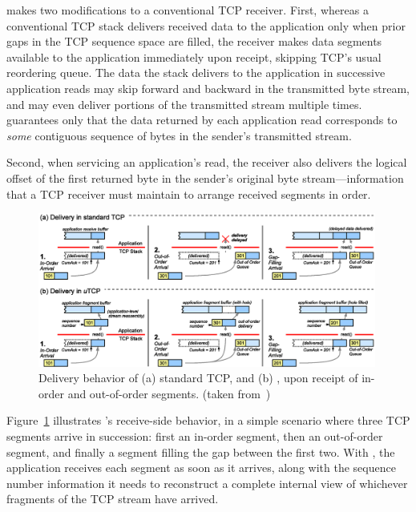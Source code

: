 \utcp makes two modifications to a conventional TCP receiver.
First, whereas a conventional TCP stack
delivers received data to the application
only when prior gaps in the TCP sequence space are filled,
the \utcp receiver
makes data segments available to the application immediately upon receipt,
skipping TCP's usual reordering queue.
The data the \utcp stack delivers to the application
in successive application reads
may skip forward and backward in the transmitted byte stream,
and \utcp may even deliver portions
of the transmitted stream multiple times.
\utcp guarantees only that the data returned by each application read
corresponds to {\em some} contiguous sequence of bytes
in the sender's transmitted stream.

Second,
when servicing an application's read,
the \utcp receiver also delivers the logical offset
of the first returned byte
in the sender's original byte stream---information 
that a TCP receiver must maintain to arrange received segments in order.

\begin{figure}[htb]
\centering
\includegraphics[width=0.99\textwidth]{figures/utcpdelivery.eps}
\caption{
Delivery behavior of (a) standard TCP, and (b) \utcp,
upon receipt of in-order and out-of-order segments.
(taken from~\cite{nowlan12fitting})}
\label{f:utcpdelivery}
\end{figure}

Figure~\ref{f:utcpdelivery} illustrates \utcp's receive-side behavior,
in a simple scenario
where three TCP segments arrive in succession:
first an in-order segment, then an out-of-order segment,
and finally a segment filling the gap between the first two.
With \utcp,
the application receives each segment as soon as it arrives,
along with the sequence number information it needs to reconstruct
a complete internal view of
whichever fragments of the TCP stream have arrived.

